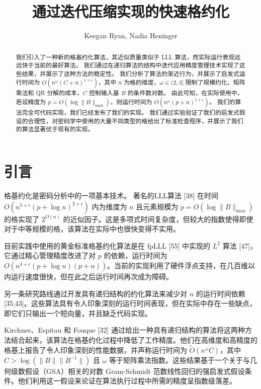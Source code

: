 \documentclass[UTF8]{ctexart}
\title{通过迭代压缩实现的快速格约化}
\author{Keegan Ryan, Nadia Heninger}
\begin{document}
\maketitle

\begin{abstract}
我们引入了一种新的格基约化算法，其近似质量类似于 LLL 算法，而实际运行表现远远快于当前的最好算法。
我们通过在递归算法的结构中迭代应用精度管理技术实现了这些结果，并展示了这种方法的稳定性。
我们分析了算法的渐近行为，并展示了启发式运行时间为 $O(n^\omega (C + n)^{1+\epsilon})$，其中 $n$ 为格的维度，$\omega \in (2, 3]$ 限制了规模约化、矩阵乘法和 QR 分解的成本，$C$ 控制输入基 $B$ 的条件数对数。
由此可知，在实际使用中，若设精度为 $p = O(\log \|B\|_{\max})$，则运行时间为 $O(n^\omega (p + n)^{1+\epsilon})$。
我们的算法完全可代码实现，我们已经发布了我们的实现。
我们通过实验验证了我们的启发式假设的合理性，对密码学中使用的大量不同类型的格给出了标准检查程序，并展示了我们的算法显著优于现有的实现。
\end{abstract}

\section{引言}

格基约化是密码分析中的一项基本技术。
著名的LLL算法 [38] 在时间 $O(n^{5+\epsilon}(p+\log n)^{2+\epsilon})$ 内为维度为 $n$ 且元素规模为 $p = O(\log \|B\|_{\max})$ 的格实现了 $2^{O(n)}$ 的近似因子。这是多项式时间复杂度，但较大的指数使得即使对于中等规模的格，该算法在实际中也很快变得不实用。

目前实践中使用的黄金标准格基约化算法是在 fpLLL [55] 中实现的 $L^2$ 算法 [47]，它通过精心管理精度改进了对 $p$ 的依赖，运行时间为 $O(n^{4+\epsilon}(p + \log n)(p + n))$。当前的实现利用了硬件浮点支持，在几百维以内运行速度很快，但在此之后运行时间再次成为障碍。

另一条研究路线通过开发具有递归结构的约化算法来减少对 $n$ 的运行时间依赖 [35,43]。这些算法具有令人印象深刻的运行时间表现，但在实际中存在一些缺点，即它们只输出一个短向量，并且缺乏代码实现。

Kirchner、Espitau 和 Fouque [32] 通过给出一种具有递归结构的算法将这两种方法结合起来，该算法在格基约化过程中降低了工作精度。他们在高维度和高精度的格基上报告了令人印象深刻的性能数据，并声称运行时间为 $\tilde{O}(n^\omega C)$，其中 $C > \log(\|B\|\|B^{-1}\|)$ 且 $\omega$ 等于矩阵乘法指数。这些结果基于一个关于与几何级数假设（GSA）相关的对数 Gram-Schmidt 范数线性回归的强启发式假设条件。他们利用这一假设来论证在算法执行过程中所需的精度呈指数级落差。
\end{document}
